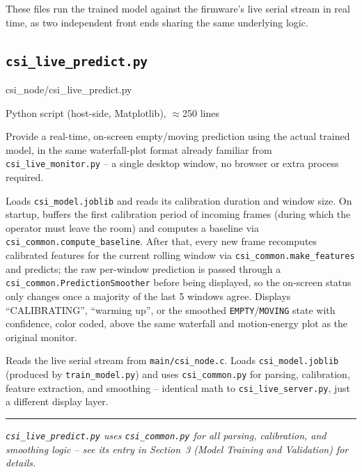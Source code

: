 \documentclass[11pt,a4paper]{article}
\newcommand{\filepath}[1]{{\small\ttfamily\color{pathgray}#1}}
\newcommand{\fileentry}[6]{%
    \subsection{\texttt{#1}}
    \filepath{#2}
    \vspace{0.15cm}
    \begin{description}[leftmargin=2.6cm, style=nextline]
        \item[Type] #3
        \item[Objective] #4
        \item[Role] #5
        \item[Connections] #6
    \end{description}
    \vspace{0.2cm}
    \hrule
    \vspace{0.3cm}
}
\begin{document}
These files run the trained model against the firmware's live serial
stream in real time, as two independent front ends sharing the same
underlying logic.

\fileentry
{csi\_live\_predict.py}
{csi\_node/csi\_live\_predict.py}
{Python script (host-side, Matplotlib), \(\approx\)250 lines}
{Provide a real-time, on-screen empty/moving prediction using the actual
    trained model, in the same waterfall-plot format already familiar
    from \texttt{csi\_live\_monitor.py} -- a single desktop window, no
    browser or extra process required.}
{Loads \texttt{csi\_model.joblib} and reads its calibration duration and
    window size. On startup, buffers the first calibration period of
    incoming frames (during which the operator must leave the room) and
    computes a baseline via \texttt{csi\_common.compute\_baseline}.
    After that, every new frame recomputes calibrated features for the
    current rolling window via \texttt{csi\_common.make\_features} and
    predicts; the raw per-window prediction is passed through a
    \texttt{csi\_common.PredictionSmoother} before being displayed, so
    the on-screen status only changes once a majority of the last 5
    windows agree. Displays ``CALIBRATING'', ``warming up'', or the
    smoothed \texttt{EMPTY}/\texttt{MOVING} state with confidence, color
    coded, above the same waterfall and motion-energy plot as the
    original monitor.}
{Reads the live serial stream from \texttt{main/csi\_node.c}. Loads
    \texttt{csi\_model.joblib} (produced by \texttt{train\_model.py}) and
    uses \texttt{csi\_common.py} for parsing, calibration, feature
    extraction, and smoothing -- identical math to
    \texttt{csi\_live\_server.py}, just a different display layer.}

\noindent\textit{\texttt{csi\_live\_predict.py} uses \texttt{csi\_common.py} for all
parsing, calibration, and smoothing logic -- see its entry in
Section~3 (Model Training and Validation) for details.}

\vspace{0.3cm}
\end{document}
